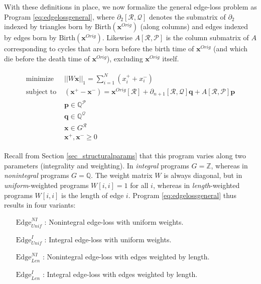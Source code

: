 \documentclass[utf8]{formatting_stuff/frontiersFPHY}
\makeatletter
\newcommand{\Z}{\mathbb{Z}}
\newcommand{\Q}{\mathbb{Q}}
\newcommand{\p}[0]{\mathbf{p}}
\newcommand{\q}[0]{\mathbf{q}}
\newcommand{\originalrep}{\mathbf{x}^{Orig}}
\newcommand{\optimalrep}{\mathbf{x}}
\newcommand{\se}{Section }
\newcommand{\NI}{^{NI}}
\newcommand{\I}{^I}
\newcommand{\unif}{_{Unif}}
\newcommand{\len}{_{Len}}
\newcommand{\birth}{\mathrm{Birth}}
\newcommand{\Edge}{\mathrm{Edge}}
\newcommand{\goodcycleindices}{\mathcal P}
\newcommand{\goodtriangles}{\mathcal Q}
\newcommand{\goodedges}{\mathcal R}
\theoremstyle{plain}
\theoremstyle{definition}
\def\namedlabel#1#2{\begingroup
    #2 
    \def\@currentlabel{#2} 
    \phantomsection\label{#1}\endgroup:
}
\providecommand{\DIFaddtex}[1]{{\protect\color{blue}\uwave{#1}}}
\providecommand{\DIFdeltex}[1]{{\protect\color{red}\sout{#1}}}
\providecommand{\DIFaddbegin}{} %
\providecommand{\DIFaddend}{} %
\providecommand{\DIFdelbegin}{} %
\providecommand{\DIFdelend}{} %
\providecommand{\DIFadd}[1]{\texorpdfstring{\DIFaddtex{#1}}{#1}} %
\providecommand{\DIFdel}[1]{\texorpdfstring{\DIFdeltex{#1}}{}} %
\makeatother
\begin{document}
With these definitions in place, we now formalize the general edge-loss problem as Program \eqref{eq:edgelossgeneral}, where  \DIFdelbegin \DIFdel{$\partial_2[\goodedges,\goodtriangles]$ }\DIFdelend \DIFaddbegin \DIFadd{$\partial_{n+1}[\goodedges,\goodtriangles]$ }\DIFaddend denotes the  submatrix of \DIFdelbegin \DIFdel{$\partial_2$ }\DIFdelend \DIFaddbegin \DIFadd{$\partial_{n+1}$ }\DIFaddend indexed by triangles born by $\birth(\originalrep)$ (along columns) and edges indexed by edges born by $\birth(\originalrep)$.  Likewise $A[ \goodedges ,\goodcycleindices]$ is the column submatrix of $A$ corresponding to cycles that are born  before the birth time of $\originalrep$ (and which die before the death time of $\originalrep$), excluding $\originalrep$ itself.

 
\begin{align}
\DIFdelbegin  
\DIFdelend \DIFaddbegin \begin{split}
    \text{minimize   } & ||W \optimalrep ||_1 = \sum_{i=1}^N  (x^+_i + x_i^-)\\
   \text{subject to  } &  
      (\optimalrep^+ - \optimalrep^- )= \originalrep[\goodedges] +   \partial_{n+1}[\goodedges, \goodtriangles]  \q + A[\goodedges, \goodcycleindices] \p \\
      & \p \in \Q^{\goodcycleindices} \\
      & \q \in \Q^{\goodtriangles} \\      
      & \optimalrep \in G^{\goodedges } \\      
      & \optimalrep^+, \optimalrep^- \geq 0 
      \end{split}\DIFaddend 
      \label{eq:edgelossgeneral}
\end{align}




 Recall from \se \eqref{sec_structuralparams} that this program varies along two parameters (integrality and weighting).  In \emph{integral} programs $G = \Z$, whereas in \emph{nonintegral} programs $G = \Q$.  The weight matrix $W$ is always diagonal, but in \emph{uniform}-weighted programs $W[i,i] = 1$ for all $i$, whereas in \emph{length}-weighted programs $W[i,i]$ is the length of edge $i$.  Program \ref{eq:edgelossgeneral} thus results in four variants:

\begin{enumerate}[style=multiline]
    \item[\namedlabel{itm:edge_NIU}{$\Edge\NI\unif$}] Nonintegral edge-loss with uniform weights.
    \item[\namedlabel{itm:edge_IU}{$\Edge\I\unif$}] Integral edge-loss with uniform weights.
    \item[\namedlabel{itm:edge_NIL}{$\Edge\NI\len$}] Nonintegral edge-loss with edges weighted by length. 
    \item[\namedlabel{itm:edge_IL}{$\Edge\I\len$}] Integral edge-loss with edges weighted by length. 
\end{enumerate}
\end{document}
